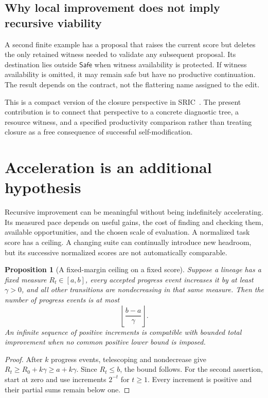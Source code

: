 \documentclass[11pt,letterpaper]{article}
\theoremstyle{plain}
\newtheorem{proposition}[theorem]{Proposition}
\theoremstyle{definition}
\newcommand{\Safe}{\mathsf{Safe}}\newcommand{\Post}{\operatorname{Post}}\newcommand{\Pareto}{\operatorname{Pareto}}
\begin{document}
\subsection{Why local improvement does not imply recursive viability}
A second finite example has a proposal that raises the current score but deletes the only retained witness needed to validate any subsequent proposal. Its destination lies outside $\Safe$ when witness availability is protected. If witness availability is omitted, it may remain safe but have no productive continuation. The result depends on the contract, not the flattering name assigned to the edit.

This is a compact version of the closure perspective in SRIC~\cite{sric}. The present contribution is to connect that perspective to a concrete diagnostic tree, a resource witness, and a specified productivity comparison rather than treating closure as a free consequence of successful self-modification.

\section{Acceleration is an additional hypothesis}\label{sec:acceleration}
Recursive improvement can be meaningful without being indefinitely accelerating. Its measured pace depends on useful gains, the cost of finding and checking them, available opportunities, and the chosen scale of evaluation. A normalized task score has a ceiling. A changing suite can continually introduce new headroom, but its successive normalized scores are not automatically comparable.

\begin{proposition}[A fixed-margin ceiling on a fixed score]\label{prop:ceiling}
Suppose a lineage has a fixed measure $R_t\in[a,b]$, every accepted progress event increases it by at least $\gamma>0$, and all other transitions are nondecreasing in that same measure. Then the number of progress events is at most
\[
\left\lfloor\frac{b-a}{\gamma}\right\rfloor.
\]
An infinite sequence of positive increments is compatible with bounded total improvement when no common positive lower bound is imposed.
\end{proposition}
\begin{proof}
After $k$ progress events, telescoping and nondecrease give $R_t\geq R_0+k\gamma\geq a+k\gamma$. Since $R_t\leq b$, the bound follows. For the second assertion, start at zero and use increments $2^{-t}$ for $t\geq1$. Every increment is positive and their partial sums remain below one.
\end{proof}
\end{document}

